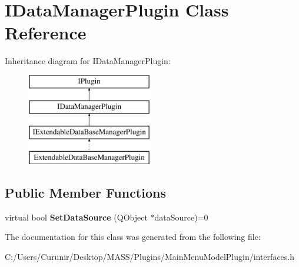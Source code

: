 \hypertarget{class_i_data_manager_plugin}{}\section{I\+Data\+Manager\+Plugin Class Reference}
\label{class_i_data_manager_plugin}
Inheritance diagram for I\+Data\+Manager\+Plugin\+:\begin{figure}[H]
\begin{center}
\leavevmode
\includegraphics[height=4.000000cm]{class_i_data_manager_plugin}
\end{center}
\end{figure}
\subsection*{Public Member Functions}
\begin{DoxyCompactItemize}
\item 
\mbox{\label{class_i_data_manager_plugin_ad9a6a153bc6fe2c64b0a4ee2013fb149}} 
virtual bool {\bfseries Set\+Data\+Source} (Q\+Object $\ast$data\+Source)=0
\end{DoxyCompactItemize}


The documentation for this class was generated from the following file\+:\begin{DoxyCompactItemize}
\item 
C\+:/\+Users/\+Curunir/\+Desktop/\+M\+A\+S\+S/\+Plugins/\+Main\+Menu\+Model\+Plugin/interfaces.\+h\end{DoxyCompactItemize}
